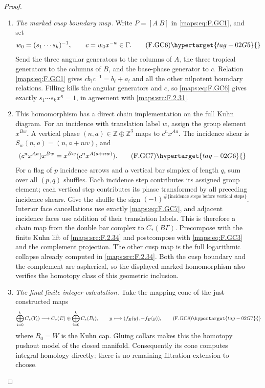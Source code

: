 \begin{proof}
\begin{enumerate}[label={$\langle1\rangle$\arabic*.}]
\item \emph{The marked cusp boundary map.}
Write $P=[A\ B]$ in \eqref{maps:eq:F.GC1}, and set
\[
 w_0=(s_1\cdots s_k)^{-1},\qquad
 c=w_0x^{-\kappa}\in\Gamma.
                                                               \tag{F.GC6}\hypertarget{tag-02G5}{}\label{maps:eq:F.GC6}
\]
Send the three angular generators to the columns of $A$,
the three tropical generators to the columns of $B$, and
the base-phase generator to $c$.  Relation \eqref{maps:eq:F.GC1} gives
$c b_i c^{-1}=b_i+a_i$ and all the other nilpotent boundary
relations.  Filling kills the angular generators and $c$,
so \eqref{maps:eq:F.GC6} gives exactly
$s_1\cdots s_kx^\kappa=1$, in agreement with \ref{maps:src:F.2.31}.

\item This homomorphism has a direct chain implementation on the
full Kuhn diagram.  For an incidence with translation label
$w$, assign the group element $x^{Bw}$.  A vertical phase
$(n,a)\in\mathbb Z\oplus\mathbb Z^3$ maps to $c^nx^{Aa}$.
The incidence shear is $S_w(n,a)=(n,a+n w)$, and
\[
 (c^nx^{Aa})x^{Bw}=x^{Bw}(c^nx^{A(a+n w)}).                \tag{F.GC7}\hypertarget{tag-02G6}{}\label{maps:eq:F.GC7}
\]
For a flag of $p$ incidence arrows and a vertical bar
simplex of length $q$, sum over all $(p,q)$ shuffles.
Each incidence step contributes its assigned group element;
each vertical step contributes its phase transformed by
all preceding incidence shears.  Give the shuffle the sign
$(-1)^{\#\{\text{incidence steps before vertical steps}\}}$.
Interior face cancellations use exactly \eqref{maps:eq:F.GC7}, and adjacent
incidence faces use addition of their translation labels.
This is therefore a chain map from the double bar complex
to $C_*(B\Gamma)$.  Precompose with the finite Kuhn lift of
\ref{maps:src:F.2.34} and postcompose with \eqref{maps:eq:F.GC3} and the complement
projection.  The other cusp map is the full logarithmic
collapse already computed in \ref{maps:src:F.2.34}.
Both the cusp boundary and the complement are aspherical,
so the displayed marked homomorphism also verifies the
homotopy class of this geometric inclusion.

\item \emph{The final finite integer calculation.}
Take the mapping cone of the just constructed maps
\[
 \bigoplus_{i=0}^k C_*(Y_i)\longrightarrow
 C_*(E)\oplus\bigoplus_{i=0}^k C_*(B_i),
 \qquad y\longmapsto(f_E(y),-f_B(y)),                     \tag{F.GC8}\hypertarget{tag-02G7}{}\label{maps:eq:F.GC8}
\]
where $B_0=W$ is the Kuhn cap.  Gluing collars makes this
the homotopy pushout model of the closed manifold.
Consequently its cone computes integral homology directly;
there is no remaining filtration extension to choose.


\end{enumerate}
\end{proof}
